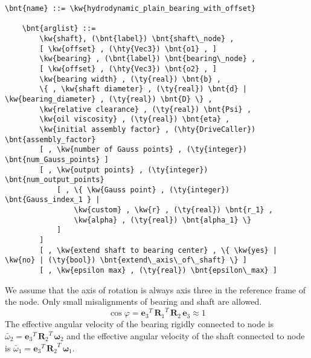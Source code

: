 \begin{Verbatim}[commandchars=\\\{\}]
    \bnt{name} ::= \kw{hydrodynamic_plain_bearing_with_offset}

    \bnt{arglist} ::=
        \kw{shaft}, (\bnt{label}) \bnt{shaft\_node} ,
        [ \kw{offset} , (\hty{Vec3}) \bnt{o1} , ]
        \kw{bearing} , (\bnt{label}) \bnt{bearing\_node} ,
        [ \kw{offset} , (\hty{Vec3}) \bnt{o2} , ]
        \kw{bearing width} , (\ty{real}) \bnt{b} ,
        \{ , \kw{shaft diameter} , (\ty{real}) \bnt{d} | \kw{bearing_diameter} , (\ty{real}) \bnt{D} \} ,
        \kw{relative clearance} , (\ty{real}) \bnt{Psi} ,
        \kw{oil viscosity} , (\ty{real}) \bnt{eta} ,
        \kw{initial assembly factor} , (\hty{DriveCaller}) \bnt{assembly_factor}
        [ , \kw{number of Gauss points} , (\ty{integer}) \bnt{num_Gauss_points} ]
        [ , \kw{output points} , (\ty{integer}) \bnt{num_output_points} 
            [ , \{ \kw{Gauss point} , (\ty{integer}) \bnt{Gauss_index_1 } |
                \kw{custom} , \kw{r} , (\ty{real}) \bnt{r_1} , 
                \kw{alpha} , (\ty{real}) \bnt{alpha_1} \}
            ]
        ]
        [ , \kw{extend shaft to bearing center} , \{ \kw{yes} | \kw{no} | (\ty{bool}) \bnt{extend\_axis\_of\_shaft} \} ]
        [ , \kw{epsilon max} , (\ty{real}) \bnt{epsilon\_max} ]
\end{Verbatim}
We assume that the axis of rotation is always axis three in the reference frame of the node. Only small misalignments of bearing and shaft are allowed.
\begin{equation}
\cos{\varphi}={\boldsymbol{e}_{3}}^T \, {\boldsymbol{R}_1}^T \, \boldsymbol{R}_2 \, \boldsymbol{e}_{3} \approx 1
\end{equation}
The effective angular velocity of the bearing rigidly connected to node  is $\bar{\omega}_2={\boldsymbol{e}_{3}}^T\,{\boldsymbol{R}_{2}}^T\,\boldsymbol{\omega}_2$ and the effective angular velocity of the shaft connected to node  is $\bar{\omega}_1={\boldsymbol{e}_{3}}^T\,{\boldsymbol{R}_{2}}^T\,\boldsymbol{\omega}_1$.
